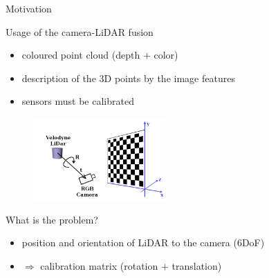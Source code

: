 \documentclass[pdf]{beamer}
\begin{document}
	\begin{frame}{Motivation}
 		\begin{block}{Usage of the camera-LiDAR fusion}
			\begin{itemize}
				\item coloured point cloud (depth $+$ color)
				\item description of the $3$D points by the image features
				\item sensors must be calibrated
			\end{itemize}
		\end{block}
		
		\begin{figure}[h]
			\center
			\includegraphics[width=0.45\textwidth]{fig/schema.png}
		\end{figure}
			
 		\begin{block}{What is the problem?}
			\begin{itemize}
				\item position and orientation of LiDAR to the camera ($6$DoF)
				\item $\Rightarrow$ calibration matrix (rotation $+$ translation)
			\end{itemize}
 		\end{block}
	\end{frame}
		
\end{document}
